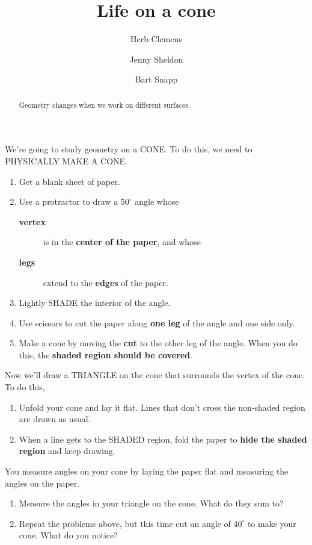 \documentclass[handout,nooutcomes,noauthor]{ximera}
\title{Life on a cone}
\author{Herb Clemens \and Jenny Sheldon \and Bart Snapp}
\begin{document}
\begin{abstract}
  Geometry changes when we work on different surfaces.
\end{abstract}
\maketitle


\begin{listOutcomes}
\item 
\end{listOutcomes}

We're going to study geometry on a CONE. To do this, we need to
PHYSICALLY MAKE A CONE.

\begin{enumerate}
\item Get a blank sheet of paper.
\item Use a protractor to draw a $50^\circ$ angle whose
  \begin{description}
    \item[\textbf{vertex}] is in the \textbf{center of the paper}, and whose
    \item[\textbf{legs}] extend to the \textbf{edges} of the paper.
  \end{description}
  \item Lightly SHADE the interior of the angle.
  \item Use scissors to cut the paper along \textbf{one leg} of the
    angle and one side only.
  \item Make a cone by moving the \textbf{cut} to the other leg of the
    angle. When you do this, the \textbf{shaded region should be covered}.
\end{enumerate}

Now we'll draw a TRIANGLE on the cone that surrounds the vertex of the
cone. To do this,
\begin{enumerate}
\item Unfold your cone and lay it flat. Lines that don't cross the
  non-shaded region are drawn as usual.
\item When a line gets to the SHADED region, fold the paper to \textbf{hide
  the shaded region} and keep drawing.
\end{enumerate}




\mynewpage



\begin{question}
   You measure angles on your cone by laying the paper flat and
   measuring the angles on the paper.
   \begin{enumerate}
     \item Measure the angles in your triangle on the cone.  What do
       they sum to?
     \item Repeat the problems above, but this time cut an angle of
       $40^\circ$ to make your cone. What do you notice?
   \end{enumerate}
\end{question}
\end{document}
